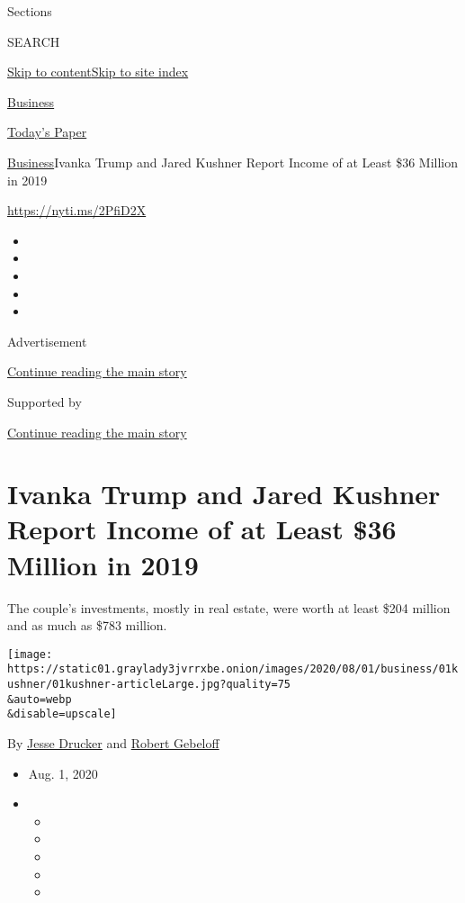 Sections

SEARCH

\protect\hyperlink{site-content}{Skip to
content}\protect\hyperlink{site-index}{Skip to site index}

\href{https://www.nytimes3xbfgragh.onion/section/business}{Business}

\href{https://myaccount.nytimes3xbfgragh.onion/auth/login?response_type=cookie\&client_id=vi}{}

\href{https://www.nytimes3xbfgragh.onion/section/todayspaper}{Today's
Paper}

\href{/section/business}{Business}\textbar{}Ivanka Trump and Jared
Kushner Report Income of at Least \$36 Million in 2019

\url{https://nyti.ms/2PfiD2X}

\begin{itemize}
\item
\item
\item
\item
\item
\end{itemize}

Advertisement

\protect\hyperlink{after-top}{Continue reading the main story}

Supported by

\protect\hyperlink{after-sponsor}{Continue reading the main story}

\hypertarget{ivanka-trump-and-jared-kushner-report-income-of-at-least-36-million-in-2019}{%
\section{Ivanka Trump and Jared Kushner Report Income of at Least \$36
Million in
2019}\label{ivanka-trump-and-jared-kushner-report-income-of-at-least-36-million-in-2019}}

The couple's investments, mostly in real estate, were worth at least
\$204 million and as much as \$783 million.

\texttt{[image: https://static01.graylady3jvrrxbe.onion/images/2020/08/01/business/01kushner/01kushner-articleLarge.jpg?quality=75\\\&auto=webp\\\&disable=upscale]}

By \href{https://www.nytimes3xbfgragh.onion/by/jesse-drucker}{Jesse
Drucker} and
\href{https://www.nytimes3xbfgragh.onion/by/robert-gebeloff}{Robert
Gebeloff}

\begin{itemize}
\item
  Aug. 1, 2020
\item
  \begin{itemize}
  \item
  \item
  \item
  \item
  \item
  \end{itemize}
\end{itemize}


